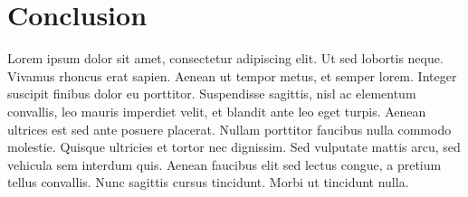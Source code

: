 \section{Conclusion}
Lorem ipsum dolor sit amet, consectetur adipiscing elit. Ut sed lobortis neque. Vivamus rhoncus erat sapien. Aenean ut tempor metus, et semper lorem. Integer suscipit finibus dolor eu porttitor. Suspendisse sagittis, nisl ac elementum convallis, leo mauris imperdiet velit, et blandit ante leo eget turpis. Aenean ultrices est sed ante posuere placerat. Nullam porttitor faucibus nulla commodo molestie. Quisque ultricies et tortor nec dignissim. Sed vulputate mattis arcu, sed vehicula sem interdum quis. Aenean faucibus elit sed lectus congue, a pretium tellus convallis. Nunc sagittis cursus tincidunt. Morbi ut tincidunt nulla.
